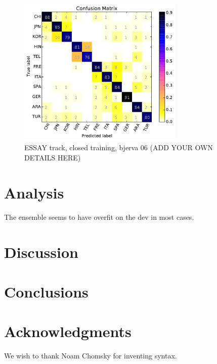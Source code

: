 \documentclass[11pt,letterpaper]{article}
\begin{document}
\begin{figure}
\centering
\includegraphics[width=0.7\textwidth]{closed_confusion_run06.pdf}
\caption{ESSAY track, closed training, bjerva 06 (ADD YOUR OWN DETAILS HERE)}
\label{fig:1}
\end{figure}

\section{Analysis}

The ensemble seems to have overfit on the dev in most cases.


\section{Discussion}

\section{Conclusions}

\section*{Acknowledgments}

We wish to thank Noam Chomsky for inventing syntax.



\end{document}
